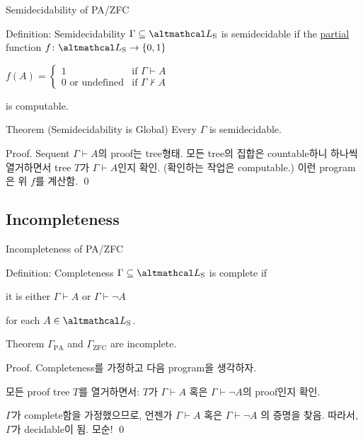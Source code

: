\documentclass[../231120_msquare_computational-logic.tex]{subfiles}
\begin{document}
\begin{frame}{Semidecidability of PA/ZFC}
    \begin{block}{Definition: Semidecidability}
        \(\Gamma \subseteq \LS\) is semidecidable if the \ul{partial} function \(f \colon \LS \to \{0,1\}\)
        \centerline{
            \(f(A) = \begin{cases}
                1 & \text{if } \Gamma \vdash A \\
                0 \text{ or undefined} & \text{if }\Gamma \not\vdash A
            \end{cases}\)
        }
        is computable.
    \end{block}

    \begin{block}{Theorem (Semidecidability is Global)}
        Every \(\Gamma\) is semidecidable.
    \end{block}
    \begin{block}{Proof.}
        Sequent \(\Gamma \vdash A\)의 proof는 tree형태.
        모든 tree의 집합은 countable하니 하나씩 열거하면서
        tree \(T\)가 \(\Gamma \vdash A\)인지 확인. (확인하는 작업은 computable.)
        이런 program은 위 \(f\)를 계산함. \qed
    \end{block}
\end{frame}

\subsection{Incompleteness}
\begin{frame}{Incompleteness of PA/ZFC}
    \begin{block}{Definition: Completeness}
        \(\Gamma \subseteq \LS\) is complete if
        \begin{itemize}
            \ii it is either \(\Gamma \vdash A\) or \(\Gamma \vdash \lnot A\)
        \end{itemize}
        for each \(A \in \LS\).
    \end{block}

    \begin{block}{Theorem}
        \(\Gamma_\text{PA}\) and \(\Gamma_\text{ZFC}\) are incomplete.
    \end{block}
    \begin{block}{Proof.}
        Completeness를 가정하고 다음 program을 생각하자.
        \begin{itemize}
            \ii 모든 proof tree \(T\)를 열거하면서:
            \ii \(T\)가 \(\Gamma \vdash A\) 혹은 \(\Gamma \vdash \lnot A\)의 proof인지 확인.
        \end{itemize}
        \(\Gamma\)가 complete함을 가정했으므로,
        언젠가 \(\Gamma \vdash A\) 혹은 \(\Gamma \vdash \lnot A\) 의 증명을 찾음.
        따라서, \(\Gamma\)가 decidable이 됨. 모순! \qed
    \end{block}
\end{frame}
\end{document}
